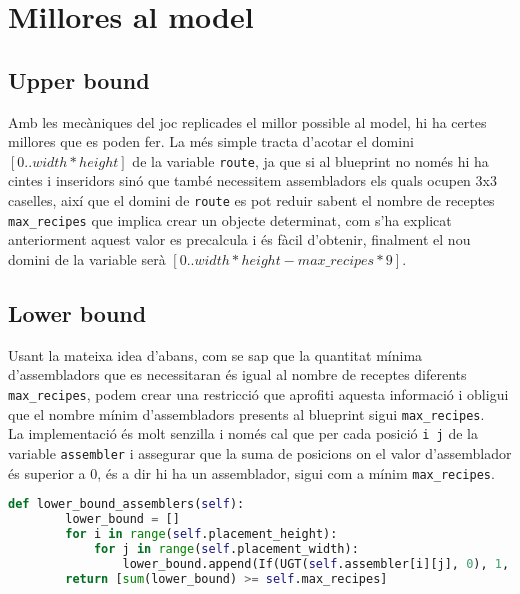 \section{Millores al model}
\subsection{Upper bound}\label{upper-bound}
Amb les mecàniques del joc replicades el millor possible al model, hi ha certes millores que es poden fer. La més simple tracta d'acotar el domini $[0..width * height]$ de la variable \texttt{route}, ja que si al blueprint no només hi ha cintes i inseridors sinó que també necessitem assembladors els quals ocupen 3x3 caselles, així que el domini de \texttt{route} es pot reduir sabent el nombre de receptes \texttt{max\_recipes} que implica crear un objecte determinat, com s'ha explicat anteriorment aquest valor es precalcula i és fàcil d'obtenir, finalment el nou domini de la variable serà $[0..width * height - max\_recipes * 9]$.

\subsection{Lower bound}\label{lower-bound}
Usant la mateixa idea d'abans, com se sap que la quantitat mínima d'assembladors que es necessitaran és igual al nombre de receptes diferents \texttt{max\_recipes}, podem crear una restricció que aprofiti aquesta informació i obligui que el nombre mínim d'assembladors presents al blueprint sigui \texttt{max\_recipes}.\\
La implementació és molt senzilla i només cal que per cada posició \texttt{i j} de la variable \texttt{assembler} i assegurar que la suma de posicions on el valor d'assemblador és superior a 0, és a dir hi ha un assemblador, sigui com a mínim \texttt{max\_recipes}.

\begin{lstlisting}[language=Python, caption=Lower Bound]
    def lower_bound_assemblers(self):
        lower_bound = []
        for i in range(self.placement_height):
            for j in range(self.placement_width):
                lower_bound.append(If(UGT(self.assembler[i][j], 0), 1, 0))
        return [sum(lower_bound) >= self.max_recipes]
\end{lstlisting}

